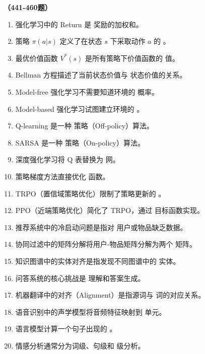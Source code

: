 \vspace{1em}
\textbf{（441-460题）}
\begin{enumerate}[resume,leftmargin=2em,itemsep=1pt]
\item 强化学习中的 Return 是 \underline{\hspace{3em}} 奖励的加权和。
\item 策略 $\pi(a|s)$ 定义了在状态 $s$ 下采取动作 $a$ 的 \underline{\hspace{3em}}。
\item 最优价值函数 $V^*(s)$ 是所有策略下价值函数的 \underline{\hspace{3em}} 值。
\item Bellman 方程描述了当前状态价值与 \underline{\hspace{3em}} 状态价值的关系。
\item Model-free 强化学习不需要知道环境的 \underline{\hspace{3em}} 概率。
\item Model-based 强化学习试图建立环境的 \underline{\hspace{3em}}。
\item Q-learning 是一种 \underline{\hspace{3em}} 策略（Off-policy）算法。
\item SARSA 是一种 \underline{\hspace{3em}} 策略（On-policy）算法。
\item 深度强化学习将 Q 表替换为 \underline{\hspace{3em}} 网。
\item 策略梯度方法直接优化 \underline{\hspace{3em}} 函数。
\item TRPO（置信域策略优化）限制了策略更新的 \underline{\hspace{3em}}。
\item PPO（近端策略优化）简化了 TRPO，通过 \underline{\hspace{3em}} 目标函数实现。
\item 推荐系统中的冷启动问题是指对 \underline{\hspace{3em}} 用户或物品缺乏数据。
\item 协同过滤中的矩阵分解将用户-物品矩阵分解为两个 \underline{\hspace{3em}} 矩阵。
\item 知识图谱中的实体对齐是指发现不同图谱中的 \underline{\hspace{3em}} 实体。
\item 问答系统的核心挑战是 \underline{\hspace{3em}} 理解和答案生成。
\item 机器翻译中的对齐（Alignment）是指源词与 \underline{\hspace{3em}} 词的对应关系。
\item 语音识别中的声学模型将音频特征映射到 \underline{\hspace{3em}} 单元。
\item 语言模型计算一个句子出现的 \underline{\hspace{3em}}。
\item 情感分析通常分为词级、句级和 \underline{\hspace{3em}} 级分析。
\end{enumerate}


